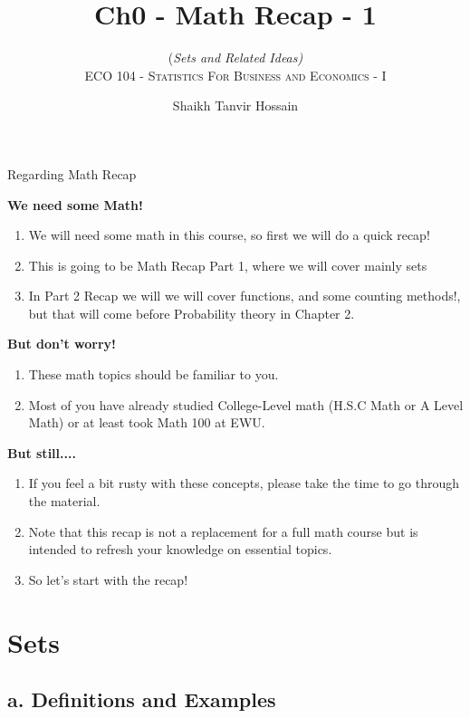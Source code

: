 \documentclass[8pt,usepdftitle=false]{beamer}
\title{\LARGE Ch0 - Math Recap - 1}
\subtitle{{\fontsize{10}{10}\selectfont\color{gray!50!balck} 
(\rm \itshape Sets and Related Ideas)}
\\\vspace*{.2cm} \scshape ECO 104 - Statistics For Business and Economics - I}
\author{Shaikh Tanvir Hossain\vspace*{-.4cm}}
\institute{ East West University, Dhaka\\  \today}
\date{\vspace{-5pt}}
\begin{document}






\begin{frame}[allowframebreaks]{Regarding Math Recap}
  
\textbf{We need some Math!}

\begin{enumerate}
\item We will need some math in this course, so first we will do a quick recap!
\item This is going to be Math Recap Part 1, where we will cover mainly \alert{sets}
\item In Part 2 Recap we will we will cover \alert{functions, and some counting methods!}, but that will come before Probability theory in Chapter 2.
\end{enumerate}

\textbf{But don't worry!}
\begin{enumerate}
\item These math topics should be familiar to you.
\item Most of you have already studied College-Level math (H.S.C Math or A Level Math) or at least took Math 100 at EWU.
\end{enumerate}

\textbf{But still....}
\begin{enumerate}
\item If you feel a bit rusty with these concepts, please take the time to go through the material.
\item Note that this recap is not a replacement for a full math course but is intended to refresh your knowledge on essential topics.
\item So let's start with the recap!
\end{enumerate}
\end{frame}


\section{Sets}
\subsection{a. Definitions and Examples}
\frame{\subsectionpage}
\end{document}

